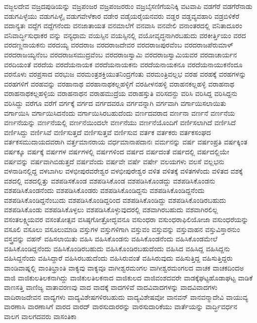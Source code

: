 {ವಜ್ಜಲದೇವ
ವಜ್ರದಪುಡಿಯನ್ನು
ವಜ್ರಪಂಜರ
ವಜ್ರಪಂಜರರುಂ
ವಜ್ರಬೈಸಣಿಗೆಯನಿಕ್ಕಿ
ವಟವಾಪಿ
ವಡಗೆರೆ
ವಡಗೆರೆನಾಡು
ವಡುಗಪಿಳ್ಳೆಯು
ವಡುಗಪಿಳ್ಳೈ
ವಡುಗವೇಳೆಕಾರ
ವಡೇರ
ವಡೈಯರೈಯನವರು
ವಡ್ಡರ
ವಡ್ಡವ್ಯವಹಾರಿ
ವಡ್ರಬಿಳಿಕೆರೆ
ವದಾನ್ಯತಃ
ವದ್ದೆಗ
ವದ್ದೆಗನೆಂದು
ವನಜಾತಾಯತ
ವನಮಾಲೆಗೆ
ವನವಾಸಿ
ವನವೇಲಿ
ವನಾಂತರದಲ್ಲಿ
ವನಿತಾದೂರಂ
ವನಿವಾರ್ದ್ಧಿಸುಧಾಕರ
ವನ್ನು
ವನ್ಯಧಾಮ
ವಯಸ್ಸಿನ
ವಯಸ್ಸಿನಲ್ಲಿ
ವಯೋವೃದ್ಧನಾಗಿರಬಹುದು
ವರಕೀರ್ತ್ತಿಯಂ
ವರದ
ವರದಣ್ಣನಾಯಕನು
ವರದಯ್ಯ
ವರದರಾಜ
ವರದರಾಜದೇವರ
ವರದರಾಜಪುರವೆಂಬ
ವರದರಾಜಪೆರುಮಾಳ್
ವರದರಾಜಯ್ಯನೆಂಬ
ವರದರಾಜಸಮುದ್ರವೆಂಬ
ವರದರಾಜಸ್ವಾಮಿ
ವರದರಾಜಸ್ವಾಮಿಯವರ
ವರದಾಚಾರ್ಯನ
ವರದಿಯಂತೆ
ವರದೆಯ
ವರದೆಯನಾಯಕ
ವರದೆಯನಾಯಕನು
ವರದೆಯನಾಯಕನೂ
ವರದೆಯನಾಯುಕನೆಂದೂ
ವರನೊಳು
ವರಪ್ರಸಾದ
ವರಭುಜ
ವರಮಂತ್ರಶಕ್ತಿಯುತನಿಂದ್ರಗೆಂತು
ವರಮಂತ್ರಿವಲ್ಲಭ
ವರಹ
ವರಹಕ್ಕೆ
ವರಹಗಳನ್ನು
ವರಹಗಳಿಗೆ
ವರಹವನ್ನು
ವರಹಾನಾಥ
ವರಹಾನಾಥಕಲ್ಲಹಳ್ಳಿಗೆ
ವರಹೀಳನಹಳ್ಳಿ
ವರಾಹನಕಲ್ಲಹಳ್ಳಿ
ವರಾಹನಾಥ
ವರಾಹನಾಥಕಲ್ಲಹಳ್ಳಿಯ
ವರಾಹನಾಥನ
ವರಾಹಮುದ್ರೆಯ
ವರಾಹಸ್ತುತಿ
ವರಿಸದನ್ದು
ವರಿಸಿ
ವರಿಸಿದ್ದ
ವರಿಸಿದ್ದನು
ವರಿಸಿದ್ದು
ವರೆಗೂ
ವರೆಗೆ
ವರ್ಗಕ್ಕೆ
ವರ್ಗದ
ವರ್ಗದವರೂ
ವರ್ಗವನ್ನಾಗಿ
ವರ್ಗವಾಗಿ
ವರ್ಗಾಯಿಸಲಾಯಿತು
ವರ್ಗಾಯಿಸಿ
ವರ್ಗಾಯಿಸಿದನೆಂದು
ವರ್ಗಾಯಿಸಿರಬಹುದೆಂದು
ವರ್ಣದವರಾದ
ವರ್ಣನಾ
ವರ್ಣನೆ
ವರ್ಣನೆಯ
ವರ್ಣನೆಯನ್ನು
ವರ್ಣನೆಯಲ್ಲಿ
ವರ್ಣನೆಯಿಂದಲೇ
ವರ್ಣನೆಯು
ವರ್ಣನೆಯೊಂದಿಗೆ
ವರ್ಣಿಸಲಾಗಿದೆ
ವರ್ಣಿಸಿದೆ
ವರ್ಣಿಸಿದ್ದು
ವರ್ಣಿಸಿವೆ
ವರ್ಣಿಸುತ್ತದೆ
ವರ್ಣಿಸುತ್ತವೆ
ವರ್ಣಿಸುವ
ವರ್ತಕ
ವರ್ತಕರು
ವರ್ತಕಸಂಘದ
ವರ್ತಕಸಮುದಾಯದವರಾಗಿ
ವರ್ತ್ತಮಾನರಾಯ
ವರ್ಧಮಾನಾಪದಾನಃ
ವರ್ಮನನ್ನು
ವರ್ಷ
ವರ್ಷಂಪ್ರತಿ
ವರ್ಷಕ್ಕಿಂತ
ವರ್ಷಕ್ಕೂ
ವರ್ಷಕ್ಕೆ
ವರ್ಷಗಳ
ವರ್ಷಗಳಲ್ಲಿ
ವರ್ಷಗಳಿಂದ
ವರ್ಷದ
ವರ್ಷದಂತೆ
ವರ್ಷದಲ್ಲಿ
ವರ್ಷದಲ್ಲಿಯೇ
ವರ್ಷವನ್ನು
ವರ್ಷವಾಗಿಬಿಡುತ್ತದೆ
ವರ್ಷವೆಂದು
ವರ್ಷವೇ
ವರ್ಷೆ
ವರ್ಷೇ
ವಲಯಗಳು
ವಲಸೆ
ವಲ್ಲಭನು
ವಳನಾಡಿನಲ್ಲಿದ್ದ
ವಳಬಾಗಿಲ
ವಳಭೀಪುರವರೇಶ್ವರ
ವಳಭೀಪುರೇಶ್ವರ
ವಳಿತ
ವಳಿತಕ್ಕೆ
ವಳಿತಗಳೆಂದು
ವಳಿತದ
ವಶಕ್ಕೆ
ವಶದಲ್ಲಿ
ವಶದಲ್ಲಿತ್ತು
ವಶಪಡಿಸಕೊಂಡ
ವಶಪಡಿಸಿಕೊಂಡ
ವಶಪಡಿಸಿಕೊಂಡದ್ದು
ವಶಪಡಿಸಿಕೊಂಡನು
ವಶಪಡಿಸಿಕೊಂಡನೆಂದು
ವಶಪಡಿಸಿಕೊಂಡರು
ವಶಪಡಿಸಿಕೊಂಡಿದ್ದನು
ವಶಪಡಿಸಿಕೊಂಡಿದ್ದನೆಂದು
ವಶಪಡಿಸಿಕೊಂಡಿದ್ದನೆಂಬುದು
ವಶಪಡಿಸಿಕೊಂಡಿದ್ದರಿಂದ
ವಶಪಡಿಸಿಕೊಂಡಿದ್ದು
ವಶಪಡಿಸಿಕೊಂಡಿರಬಹುದು
ವಶಪಡಿಸಿಕೊಂಡು
ವಶಪಡಿಸಿಕೊಳ್ಳಲು
ವಶಪಡಿಸಿಕೊಳ್ಳುವುದರಲ್ಲಿ
ವಶವಾಗಿರಬಹುದು
ವಶವಾಗಿರಲಿಲ್ಲ
ವಸಂತಲಕ್ಷ್ಮಿಯವರ
ವಸಂತೋತ್ಸವ
ವಸಿಷ್ಠಗೋತ್ರೋದ್ಭವನೂ
ವಸುಂಧರಾ
ವಸುಂಧರಾಫಿಲಿಯೋಜಾ
ವಸುಂಧರೆಯನ್ನು
ವಸೂಲಿ
ವಸೂಲು
ವಸೂಲುಮಾಡಿ
ವಸ್ತುಗಳ
ವಸ್ತುಗಳಿಗಾಗಿ
ವಸ್ತುವಂ
ವಸ್ತುವನ್ನು
ವಸ್ತುವಾಹನ
ವಸ್ತುವಿಸ್ತಾರನುಂ
ವಸ್ತ್ರವನ್ನು
ವಹನ್
ವಹಿಸಲಾಯಿತು
ವಹಿಸಿ
ವಹಿಸಿಕೊಂಡನು
ವಹಿಸಿಕೊಂಡನೆಂದು
ವಹಿಸಿಕೊಂಡಮೇಲೆ
ವಹಿಸಿಕೊಂಡಿದ್ದನೆಂದು
ವಹಿಸಿಕೊಂಡಿರಬಹುದು
ವಹಿಸಿಕೊಂಡಿರಬಹುದೆಂದು
ವಹಿಸಿದ
ವಹಿಸಿದ್ದ
ವಹಿಸಿದ್ದನು
ವಹಿಸಿದ್ದನೆಂದು
ವಹಿಸಿದ್ದಾರೆ
ವಹಿಸಿರಬಹುದೆಂದು
ವಹಿಸಿರುವಂತೆ
ವಹಿಸಿರುವುದು
ವಹಿಸುತ್ತಿದ್ದ
ವಹಿಸುತ್ತಿದ್ದರು
ವಾಂಡಿವಾಷ್ನಲ್ಲಿ
ವಾಂತಿಭ್ರಾಂತಿ
ವಾಕ್ಯವು
ವಾಕ್ಯವೂ
ವಾಗೀಶ್ವರಮಂಗಲ
ವಾಗೀಶ್ವರಮಂಗಲದ
ವಾಚಕ
ವಾಚಕದಿಂದಅ
ವಾಜಿ
ವಾಜಿಕುಲತಿಲಕನಾಗಿದ್ದು
ವಾಜಿಕುಲತಿಲಕನಾದ
ವಾಜಿಕುಲದ
ವಾಜಿವಂಶದವರೇ
ವಾಡಕ್ಕೆಘಟ್ಟಹೊಡಾಘಟ್ಟ
ವಾಡಿಕೆ
ವಾಣಸತ್ತಿ
ವಾಣಿಜ್ಯ
ವಾತಾವರಣವು
ವಾದ
ವಾದಕ್ಕೆ
ವಾದಗಳಿವೆ
ವಾದವಿವಾದಗಳನ್ನು
ವಾದವಿವಾದಗಳು
ವಾದಿರಾಜದೇವನ
ವಾದ್ಯಗಳು
ವಾದ್ಯವಿಶೇಷಗಳಿರಬಹುದು
ವಾದ್ಯವಿಶೇಷವೋ
ವಾನವನ್
ವಾನವನ್ಮಾದೇವಿ
ವಾಯುವ್ಯ
ವಾರಣಾಸಿ
ವಾರಣಾಸಿಗೆ
ವಾರದ
ವಾರದ್
ವಾರಸುದಾರರನ್ನು
ವಾರಸುದಾರಿಕೆಯು
ವಾರ್ತೆಯನ್ನು
ವಾರ್ದ್ಧಿವರ್ಧನ
ವಾಲಗ
ವಾಲಗದವರು
ವಾಸಂತಿಕಾ
}
